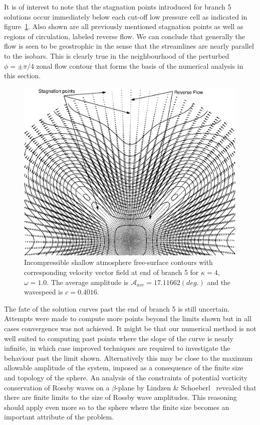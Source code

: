 It is of interest to note that the stagnation points introduced for branch 5 solutions occur immediately below each cut-off low pressure cell as indicated in figure~\ref{fig:k4w1fsvvb5end}. Also shown are all previously mentioned stagnation points as well as regions of circulation, labeled reverse flow. We can conclude that generally the flow is seen to be geostrophic in the sense that the streamlines are nearly parallel to the isobars. This is clearly true in the neighbourhood of the perturbed $\phi=\pm\pi/4$ zonal flow contour that forms the basis of the numerical analysis in this section.
\begin{figure}[htbp]
	\centering
		\includegraphics[scale=0.75]{IMAGES/k4w1fsvvb5end.eps}
	\caption{Incompressible shallow atmosphere free-surface contours with corresponding velocity vector field at end of branch 5 for $\kappa=4$, $\omega=1.0$. The average amplitude is $\mathcal{A}_{ave}=17.11662 (deg.)$ and the wavespeed is $c=0.4016$.}
	\label{fig:k4w1fsvvb5end}
\end{figure}

The fate of the solution curves past the end of branch 5 is still uncertain. Attempts were made to compute more points beyond the limits shown but in all cases convergence was not achieved. It might be that our numerical method is not well suited to computing past points where the slope of the curve is nearly infinite, in which case improved techniques are required to investigate the behaviour past the limit shown. Alternatively this may be close to the maximum allowable amplitude of the system, imposed as a consequence of the finite size and topology of the sphere. An analysis of the constraints of potential vorticity conservation of Rossby waves on a $\beta$-plane by Lindzen \& Schoeberl~\cite{Lindzen:NLR} revealed that there are finite limits to the size of Rossby wave amplitudes. This reasoning should apply even more so to the sphere where the finite size becomes an important attribute of the problem.


